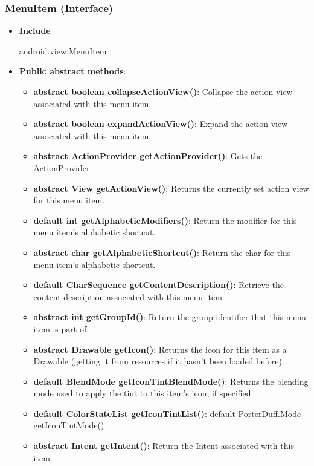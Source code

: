 \documentclass{report}
\begin{document}
\begin{itemize}
    \subsubsection{MenuItem (Interface)}
    \begin{itemize}
        \item \textbf{Include}
            \bigbreak \noindent 
            \begin{javacode}
                android.view.MenuItem
            \end{javacode}
        \item \textbf{Public abstract methods}:
            \begin{itemize}
                \item \textbf{abstract boolean	collapseActionView()}: Collapse the action view associated with this menu item.
                \item \textbf{abstract boolean	expandActionView()}: Expand the action view associated with this menu item.
                \item \textbf{abstract ActionProvider	getActionProvider()}: Gets the ActionProvider.
                \item \textbf{abstract View	getActionView()}: Returns the currently set action view for this menu item.
                \item \textbf{default int	getAlphabeticModifiers()}: Return the modifier for this menu item's alphabetic shortcut.
                \item \textbf{abstract char	getAlphabeticShortcut()}: Return the char for this menu item's alphabetic shortcut.
                \item \textbf{default CharSequence	getContentDescription()}: Retrieve the content description associated with this menu item.
                \item \textbf{abstract int	getGroupId()}: Return the group identifier that this menu item is part of.
                \item \textbf{abstract Drawable	getIcon()}: Returns the icon for this item as a Drawable (getting it from resources if it hasn't been loaded before).
                \item \textbf{default BlendMode	getIconTintBlendMode()}: Returns the blending mode used to apply the tint to this item's icon, if specified.
                \item \textbf{default ColorStateList	getIconTintList()}: default PorterDuff.Mode	getIconTintMode()
                \item \textbf{abstract Intent	getIntent()}: Return the Intent associated with this item.

\end{itemize}
\end{itemize}
\end{itemize}
\end{document}
